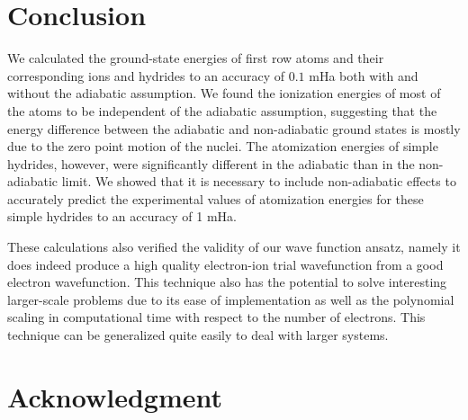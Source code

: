 \documentclass[pra,superscriptaddress,groupedaddress,twocolumn]{revtex4}
\begin{document}
\section{Conclusion}
We calculated the ground-state energies of first row atoms and their corresponding ions and hydrides to an accuracy of $0.1$ mHa both with and without the adiabatic assumption. We found the ionization energies of most of the atoms to be independent of the adiabatic assumption, suggesting that the energy difference between the adiabatic and non-adiabatic ground states is mostly due to the zero point motion of the nuclei. The atomization energies of simple hydrides, however, were significantly different in the adiabatic than in the non-adiabatic limit. We showed that it is necessary to include non-adiabatic effects to accurately predict the experimental values of atomization energies for these simple hydrides to an accuracy of 1 mHa.

These calculations also verified the validity of our wave function ansatz, namely it does indeed produce a high quality electron-ion trial wavefunction from a good electron wavefunction. This technique also has the potential to solve interesting larger-scale problems due to its ease of implementation as well as the polynomial scaling in computational time with respect to the number of electrons.  This technique can be generalized quite easily to deal with larger systems.

\section{Acknowledgment}



\end{document}
